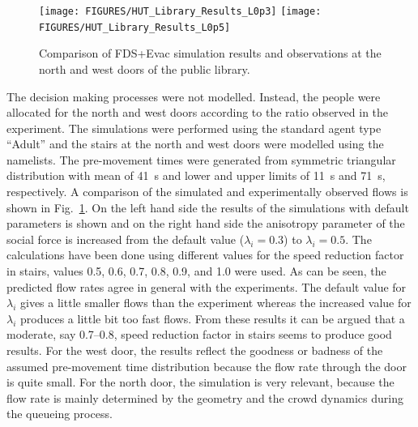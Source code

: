 \documentclass[12pt,a4paper,final,twoside]{stylevk}
\begin{document}
\begin{enumerate}
%
\begin{figure}[!tb]
  \centerline{
    \texttt{[image: FIGURES/HUT\_Library\_Results\_L0p3]} 
    \texttt{[image: FIGURES/HUT\_Library\_Results\_L0p5]} 
  }
  \caption{Comparison of FDS+Evac simulation results and observations
    at the north and west doors of the public
    library.}\label{Fig_KirjastoResults}
\end{figure}
  
The decision making processes were not modelled.  Instead, the people
were allocated for the north and west doors according to the ratio
observed in the experiment.  The simulations were performed using the
standard agent type ``Adult'' and the stairs at the north and west
doors were modelled using the  namelists.  The
pre-movement times were generated from symmetric triangular
distribution with mean of 41~s and lower and upper limits of 11~s and
71~s, respectively.  A comparison of the simulated and experimentally
observed flows is shown in Fig.~\ref{Fig_KirjastoResults}.  On the
left hand side the results of the simulations with default parameters
is shown and on the right hand side the anisotropy parameter of the
social force is increased from the default value ($\lambda_i=0.3$) to
$\lambda_i=0.5$.  The calculations have been done using different
values for the speed reduction factor in stairs, values 0.5, 0.6, 0.7,
0.8, 0.9, and 1.0 were used.  As can be seen, the predicted flow rates
agree in general with the experiments.  The default value for
$\lambda_i$ gives a little smaller flows than the experiment whereas
the increased value for $\lambda_i$ produces a little bit too fast
flows.  From these results it can be argued that a moderate, say
0.7--0.8, speed reduction factor in stairs seems to produce good
results.  For the west door, the results reflect the goodness or
badness of the assumed pre-movement time distribution because the flow
rate through the door is quite small.  For the north door, the
simulation is very relevant, because the flow rate is mainly
determined by the geometry and the crowd dynamics during the queueing
process.
%
%
\end{enumerate}
%





\end{document}
